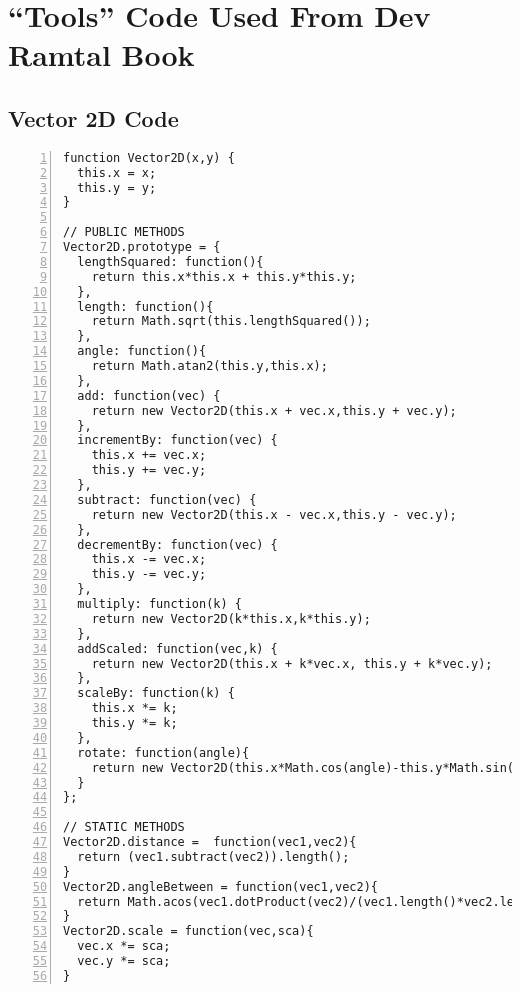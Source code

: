 
\chapter{``Tools'' Code Used From Dev Ramtal Book} %

\label{AppendixD} %



\section{Vector 2D Code}
\begin{lstlisting}[breaklines=true, frame=single, numbers=left, caption=Vector code used to find various calculations of vectors]
function Vector2D(x,y) {
  this.x = x;
  this.y = y;   
}   

// PUBLIC METHODS 
Vector2D.prototype = {    
  lengthSquared: function(){
    return this.x*this.x + this.y*this.y;
  },
  length: function(){
    return Math.sqrt(this.lengthSquared());
  },  
  angle: function(){
    return Math.atan2(this.y,this.x);
  },  
  add: function(vec) {
    return new Vector2D(this.x + vec.x,this.y + vec.y);
  },
  incrementBy: function(vec) {
    this.x += vec.x;
    this.y += vec.y;
  },    
  subtract: function(vec) {
    return new Vector2D(this.x - vec.x,this.y - vec.y);
  },
  decrementBy: function(vec) {
    this.x -= vec.x;
    this.y -= vec.y;
  },    
  multiply: function(k) {
    return new Vector2D(k*this.x,k*this.y);
  },    
  addScaled: function(vec,k) {
    return new Vector2D(this.x + k*vec.x, this.y + k*vec.y);
  },  
  scaleBy: function(k) {
    this.x *= k;
    this.y *= k;
  },
  rotate: function(angle){
    return new Vector2D(this.x*Math.cos(angle)-this.y*Math.sin(angle),this.x*Math.sin(angle)+this.y*Math.cos(angle));
  } 
};    

// STATIC METHODS
Vector2D.distance =  function(vec1,vec2){
  return (vec1.subtract(vec2)).length(); 
}
Vector2D.angleBetween = function(vec1,vec2){
  return Math.acos(vec1.dotProduct(vec2)/(vec1.length()*vec2.length()));
}
Vector2D.scale = function(vec,sca){
  vec.x *= sca;
  vec.y *= sca;
}
\end{lstlisting}









